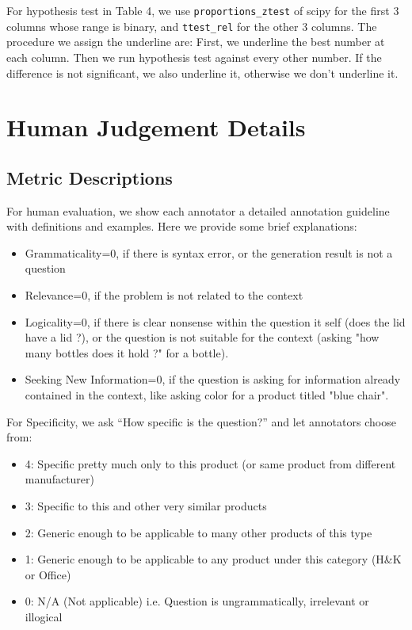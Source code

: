 For hypothesis test in Table 4, we use \texttt{proportions\_ztest} of scipy for the first 3 columns whose range is binary, and \texttt{ttest\_rel} for the other 3 columns. The procedure we assign the underline are: First, we underline the best number at each column. Then we run hypothesis test against every other number. If the difference is not significant, we also underline it, otherwise we don't underline it. 

\section{Human Judgement Details}
\subsection{Metric Descriptions}
For human evaluation, we show each annotator a detailed annotation guideline with definitions and examples. Here we provide some brief explanations:
\begin{itemize}
  \item Grammaticality=0, if there is syntax error, or the generation result is not a question
  \item Relevance=0, if the problem is not related to the context
  \item Logicality=0, if there is clear nonsense within the question it self (does the lid have a lid ?), or the question is not suitable for the context (asking "how many bottles does it hold ?" for a bottle).
  \item Seeking New Information=0, if the question is asking for information already contained in the context, like asking color for a product titled "blue chair".
\end{itemize}

For Specificity, we ask “How specific is the question?”
and let annotators choose from:
\begin{itemize}
  \item 4: Specific pretty much only to this product (or same product from different manufacturer)
  \item 3: Specific to this and other very similar products
  \item 2: Generic enough to be applicable to many other products of this type
  \item 1: Generic enough to be applicable to any product under this category (H\&K or Office)
  \item 0: N/A (Not applicable) i.e. Question is ungrammatically, irrelevant or illogical
\end{itemize}

